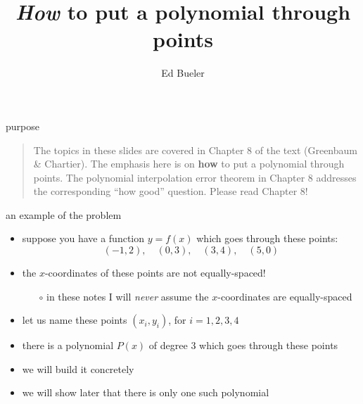 \documentclass[10pt,hyperref]{beamer}
\title{\emph{How} to put a polynomial through points}
\author{Ed Bueler}
\institute{MATH 310 Numerical Analysis}
\date{}
\begin{document}
\begin{frame}
  \maketitle
\end{frame}


\begin{frame}{purpose}
\begin{quote}

\bigskip
The topics in these slides are covered in Chapter 8 of the text (Greenbaum \& Chartier).  The emphasis here is on \textbf{how} to put a polynomial through points.  The polynomial interpolation error theorem in Chapter 8 addresses the corresponding ``how good'' question.  Please read Chapter 8!


\bigskip
\end{quote}
\end{frame}

\begin{frame}{an example of the problem}

\begin{itemize}
\item suppose you have a function $y=f(x)$ which goes through these points:
   $$(-1,2), \quad (0,3), \quad (3,4), \quad (5,0)$$
\item the $x$-coordinates of these points are not equally-spaced!
  \begin{itemize}
  \item[$\circ$]  in these notes I will \emph{never} assume the $x$-coordinates are equally-spaced
  \end{itemize}
\item let us name these points $(x_i,y_i)$, for $i=1,2,3,4$
\item there is a polynomial $P(x)$ of degree 3 which goes through these points
\item we will build it concretely
\item we will show later that there is only one such polynomial
\end{itemize}
\end{frame}
\end{document}
